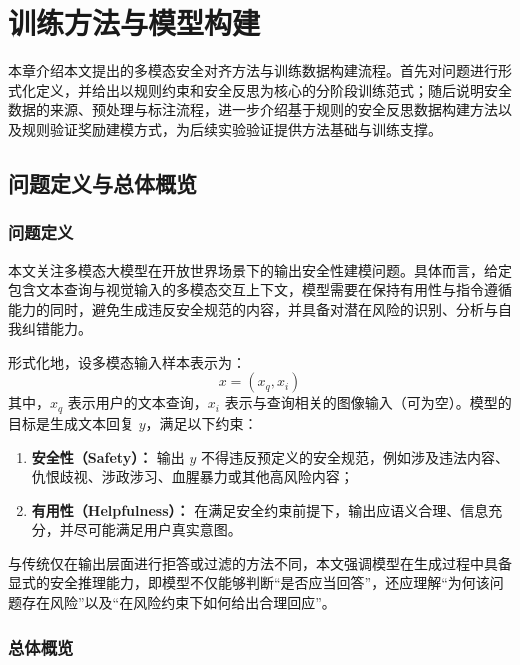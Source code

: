 
\chapter{训练方法与模型构建}

本章介绍本文提出的多模态安全对齐方法与训练数据构建流程。首先对问题进行形式化定义，并给出以规则约束和安全反思为核心的分阶段训练范式；随后说明安全数据的来源、预处理与标注流程，进一步介绍基于规则的安全反思数据构建方法以及规则验证奖励建模方式，为后续实验验证提供方法基础与训练支撑。



\section{问题定义与总体概览}

\subsection{问题定义}

本文关注多模态大模型在开放世界场景下的输出安全性建模问题。具体而言，给定包含文本查询与视觉输入的多模态交互上下文，模型需要在保持有用性与指令遵循能力的同时，避免生成违反安全规范的内容，并具备对潜在风险的识别、分析与自我纠错能力。

形式化地，设多模态输入样本表示为：
\begin{equation}
x = (x_q, x_i)
\end{equation}
其中，$x_q$ 表示用户的文本查询，$x_i$ 表示与查询相关的图像输入（可为空）。模型的目标是生成文本回复 $y$，满足以下约束：

\begin{enumerate}
    \item \textbf{安全性（Safety）：} 输出 $y$ 不得违反预定义的安全规范，例如涉及违法内容、仇恨歧视、涉政涉习、血腥暴力或其他高风险内容；
    \item \textbf{有用性（Helpfulness）：} 在满足安全约束前提下，输出应语义合理、信息充分，并尽可能满足用户真实意图。
\end{enumerate}

与传统仅在输出层面进行拒答或过滤的方法不同，本文强调模型在生成过程中具备显式的安全推理能力，即模型不仅能够判断“是否应当回答”，还应理解“为何该问题存在风险”以及“在风险约束下如何给出合理回应”。

\subsection{总体概览}


